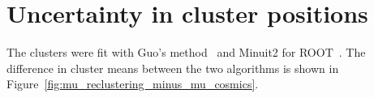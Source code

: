 

\chapter[Cluster position uncertainty]{Uncertainty in cluster positions}
\label{appendix:clustering}





The clusters were fit with Guo's method~\cite{guo_simple_2011} and Minuit2 for ROOT~\cite{hatlo_developments_2005}. The difference in cluster means between the two algorithms is shown in Figure~\ref{fig:mu_reclustering_minus_mu_cosmics}.

